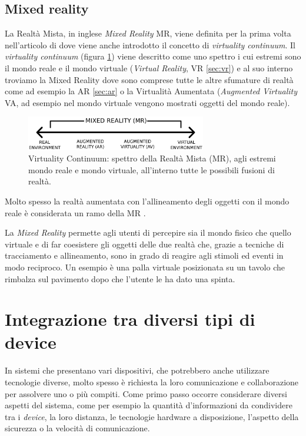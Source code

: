 \subsection{Mixed reality}
La Realtà Mista, in inglese \textit{Mixed Reality} MR, viene definita per la prima volta nell'articolo  \cite{MilgramMRTaxonomy} di  dove viene anche introdotto il concetto di \textit{virtuality continuum}.
Il \textit{virtuality continuum} (figura \ref{fig:virtualcontinuum}) viene descritto come uno spettro i cui estremi sono il mondo reale e il mondo virtuale (\textit{Virtual Reality}, VR \ref{sec:vr}) e al suo interno troviamo la Mixed Reality dove sono comprese tutte le altre sfumature di realtà come ad esempio la AR \ref{sec:ar} o la Virtualità Aumentata (\textit{Augmented Virtuality} VA, ad esempio nel mondo virtuale vengono mostrati oggetti del mondo reale).
\begin{figure} 
    \centering
    \includegraphics[width=0.7\textwidth]{img/Reality-Virtuality_Continuum.png}
    \caption{Virtuality Continuum: spettro della Realtà Mista (MR), agli estremi mondo reale e mondo virtuale, all'interno tutte le possibili fusioni di realtà. \cite{virtualityContinumImage}}
    \label{fig:virtualcontinuum}
\end{figure}

Molto spesso la realtà aumentata con l'allineamento degli oggetti con il mondo reale è considerata un ramo della MR \cite{MRsurvey}.

La \textit{Mixed Reality} permette agli utenti di percepire sia il mondo fisico che quello virtuale e di far coesistere gli oggetti delle due realtà che, grazie a tecniche di tracciamento e allineamento, sono in grado di reagire agli stimoli ed eventi in modo reciproco. Un esempio è una palla virtuale posizionata su un tavolo che rimbalza sul pavimento dopo che l'utente le ha dato una spinta.

\section{Integrazione tra diversi tipi di device}
In sistemi che presentano vari dispositivi, che potrebbero anche utilizzare tecnologie diverse, molto spesso è richiesta la loro comunicazione e collaborazione per assolvere uno o più compiti.
Come primo passo occorre considerare diversi aspetti del sistema, come per esempio la quantità d'informazioni da condividere tra i \textit{device}, la loro distanza, le tecnologie hardware a disposizione, l'aspetto della sicurezza o la velocità di comunicazione.

